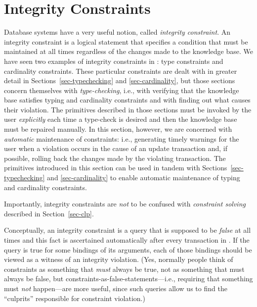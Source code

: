 
\section{Integrity Constraints}
\label{sec-kb-constraints}

Database systems have a very useful notion, called \emph{integrity constraint}. 
An integrity constraint is a logical statement that specifies a condition
that must be maintained at all times regardless of the changes made to the
knowledge base. We have seen two examples of integrity constraints in
\FLSYSTEM: type constraints and cardinality constraints. These particular
constraints are dealt with in greater detail in
Sections~\ref{sec-typechecking} and \ref{sec-cardinality}, but those
sections concern themselves with
\emph{type-checking}, i.e., with verifying that the knowledge base
satisfies  typing and cardinality constraints and with finding out what
causes their violation.
The primitives described in those sections must be invoked by
the user \emph{explicitly} each time a type-check is desired and then the
knowledge base must be repaired manually.
In this section, however, we are concerned with \emph{automatic} maintenance of
constraints: i.e., generating timely warnings for the user when a violation occurs in the cause of an
update transaction and, if possible, rolling back the changes made by the violating
transaction. The primitives introduced in this section can be used in
tandem with Sections~\ref{sec-typechecking} and \ref{sec-cardinality}
to enable automatic maintenance of typing and cardinality constraints.

Importantly, integrity constraints are \emph{not} to be confused with
\emph{constraint solving} described in Section~\ref{sec-clp}.

Conceptually, an integrity constraint is a query that is supposed
to be \emph{false} at all times and this fact is ascertained automatically
after every transaction in \ERGO. If the query is true for some bindings of its
arguments, each of those bindings should be viewed as  a witness of an
integrity violation.
(Yes, normally people think of constraints as something that \emph{must}
always be true, not as something that must always be false, but
constraints-as-false-statements---i.e., requiring that something must \emph{not}
happen---are more useful, since such queries allow us to find the
``culprits''
responsible for constraint violation.)

